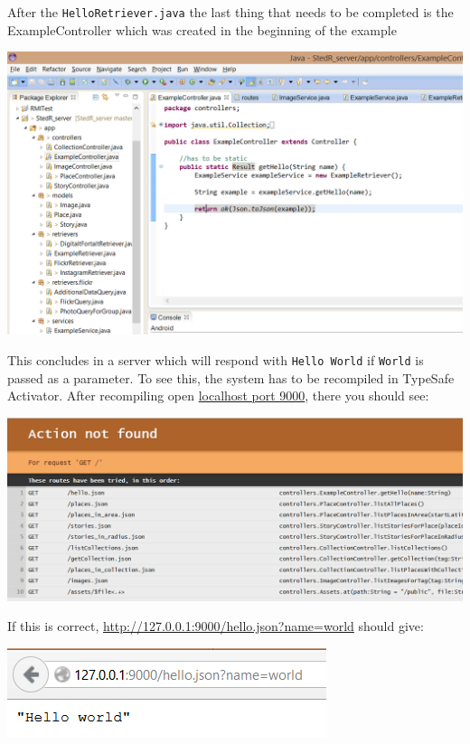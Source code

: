 \documentclass[11pt,a4paper,oneside]{article}
\begin{document}
After the \texttt{HelloRetriever.java} the last thing that needs to be completed is the ExampleController which was created in the beginning of the example

\begin{center}
\includegraphics[scale=0.6]{guide/eclipse6.png} 
\end{center}

This concludes in a server which will respond with \texttt{Hello World} if  \texttt{World} is passed as a parameter. To see this, the system has to be recompiled in TypeSafe Activator. After recompiling open \href{http://127.0.0.1:9000}{localhost port 9000}, there you should see:

\begin{center}
\includegraphics[scale=0.6]{guide/localhost.png} 
\end{center}

If this is correct,  \href{http://127.0.0.1:9000/hello.json?name=world}{http://127.0.0.1:9000/hello.json?name=world} should give:

\begin{center}
\includegraphics[scale=0.8]{guide/completed.png} 
\end{center}
\end{document}
